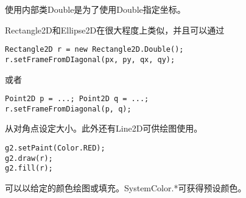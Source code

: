 \documentclass{ctexart}
\begin{document}
使用内部类Double是为了使用Double指定坐标。
\par
Rectangle2D和Ellipse2D在很大程度上类似，并且可以通过
\begin{lstlisting}
Rectangle2D r = new Rectangle2D.Double();
r.setFrameFromDIagonal(px, py, qx, qy);
\end{lstlisting}
或者
\begin{lstlisting}
Point2D p = ...; Point2D q = ...;
r.setFrameFromDiagonal(p, q);
\end{lstlisting}
从对角点设定大小。此外还有Line2D可供绘图使用。
\begin{lstlisting}
g2.setPaint(Color.RED);
g2.draw(r);
g2.fill(r);
\end{lstlisting}
\par
可以以给定的颜色绘图或填充。SystemColor.*可获得预设颜色。
\end{document}
